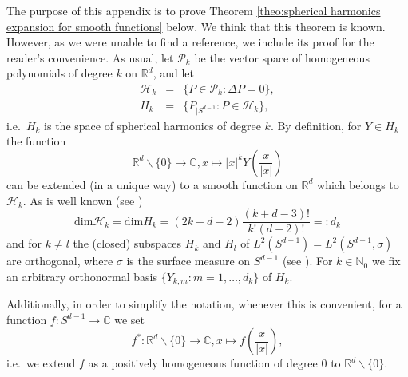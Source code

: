 \documentclass[a4paper,10pt]{amsart}
\newtheorem*{crucial lemma}{Lemma \ref{lem:nice polynomial2}}
\theoremstyle{definition}
\newcommand{\R}{\mathbb{R}}
\newcommand{\C}{\mathbb{C}}
\newcommand{\N}{\mathbb{N}}
\begin{document}
The purpose of this appendix is to prove Theorem \ref{theo:spherical harmonics expansion for smooth functions} below. We think that this theorem is known. However, as we were unable to find a reference, we include its proof for the reader's convenience. As usual, let $\mathcal{P}_k$ be the vector space of homogeneous polynomials of degree $k$ on $\R^d$, and let
\begin{eqnarray*}
	\mathcal{H}_k&=&\{P\in\mathcal{P}_k\colon \Delta P=0\},\\
	H_k&=&\{P_{|S^{d-1}}\colon P\in\mathcal{H}_k\},
\end{eqnarray*}
i.e.~$H_k$ is the space of spherical harmonics of degree $k$. By definition, for $Y\in H_k$ the function
\[\R^d\backslash\{0\}\rightarrow \C, x\mapsto |x|^kY\left(\frac{x}{|x|}\right)\]
can be extended (in a unique way) to a smooth function on $\R^d$ which belongs to $\mathcal{H}_k$. As is well known (see \cite[Corollary 2.55]{Folland1995})
\[\text{dim}\mathcal{H}_k=\text{dim}H_k=(2k+d-2)\frac{(k+d-3)!}{k!(d-2)!}=:d_k\]
and for $k\neq l$ the (closed) subspaces $H_k$ and $H_l$ of $L^2(S^{d-1})=L^2(S^{d-1},\sigma)$ are orthogonal, where $\sigma$ is the surface measure on $S^{d-1}$ (see \cite[Theorem 2.53]{Folland1995}). For $k\in\N_0$ we fix an arbitrary orthonormal basis $\{Y_{k,m}\colon m=1,\ldots, d_k\}$ of $H_k$.

Additionally, in order to simplify the notation, whenever this is convenient, for a function $f:S^{d-1}\rightarrow \C$ we set
\[f^*\colon\R^d\backslash\{0\}\rightarrow\C, x\mapsto f\left(\frac{x}{|x|}\right),\]
i.e.~we extend $f$ as a positively homogeneous function of degree 0 to $\R^d\backslash\{0\}$.
\end{document}
